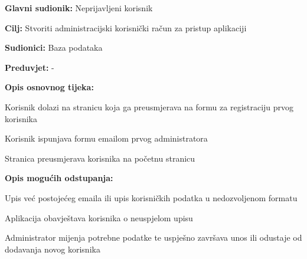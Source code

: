 					\noindent {}
					\begin{packed_item}

						\item \textbf{Glavni sudionik:} Neprijavljeni korisnik
						\item \textbf{Cilj:} Stvoriti administracijski korisnički račun za pristup aplikaciji
						\item \textbf{Sudionici:} Baza podataka
						\item \textbf{Preduvjet:} - 
						\item \textbf{Opis osnovnog tijeka:}

						\item[] \begin{packed_enum}

							\item Korisnik dolazi na stranicu koja ga preusmjerava na formu za registraciju prvog korisnika
							\item Korisnik ispunjava formu emailom prvog administratora
							\item Stranica preusmjerava korisnika na početnu stranicu

						\end{packed_enum}

						\item \textbf{Opis mogućih odstupanja:}

						\item[] \begin{packed_item}

							\item[2.a] Upis već postojećeg emaila ili upis korisničkih
							podatka u nedozvoljenom formatu
							\item[] \begin{packed_enum}

								\item Aplikacija obavještava korisnika o neuspjelom upisu
								\item Administrator mijenja potrebne podatke te uspješno završava unos ili
								odustaje od dodavanja novog korisnika

							\end{packed_enum}

						\end{packed_item}
					\end{packed_item}

